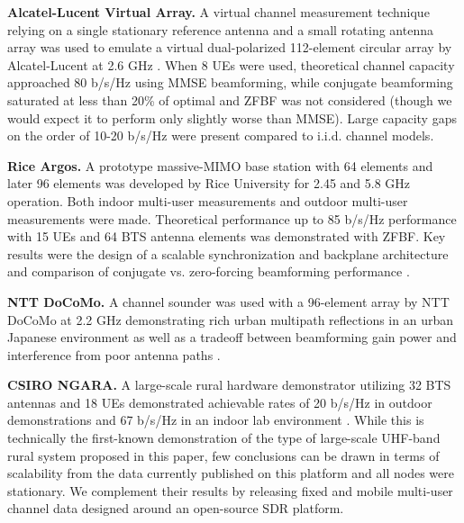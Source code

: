 \textbf{Alcatel-Lucent Virtual Array.}
A virtual channel measurement technique relying on a single stationary reference antenna and a small rotating antenna array was used to emulate a virtual dual-polarized 112-element circular array by Alcatel-Lucent at 2.6 GHz \cite{hoydis2012channel}.
	When 8 \acp{UE} were used, theoretical channel capacity approached 80 b/s/Hz using \ac{MMSE} beamforming, while conjugate beamforming saturated at less than 20\% of optimal and \ac{ZFBF} was not considered (though we would expect it to perform only slightly worse than \ac{MMSE}).
	Large capacity gaps on the order of 10-20 b/s/Hz were present compared to i.i.d. channel models.

\textbf{Rice Argos.}
A prototype massive-MIMO base station with 64 elements and later 96 elements was developed by Rice University for 2.45 and 5.8 GHz operation. Both indoor multi-user measurements \cite{shepard2012argos, shepard2013argosv2, shepard2013practical} and outdoor multi-user measurements \cite{everett2015measurement} were made. Theoretical performance up to 85 b/s/Hz performance with 15 \acp{UE} and 64 \ac{BTS} antenna elements was demonstrated with \ac{ZFBF}.
Key results were the design of a scalable synchronization and backplane architecture \cite{shepard2012argos} and comparison of conjugate vs. zero-forcing beamforming performance \cite{shepard2013practical}.

\textbf{NTT DoCoMo.}
A channel sounder was used with a 96-element array by NTT DoCoMo at 2.2 GHz demonstrating rich urban multipath reflections in an urban Japanese environment as well as a tradeoff between beamforming gain power and interference from poor antenna paths \cite{kataoka2014performance}.

\textbf{CSIRO NGARA.}
A large-scale rural hardware demonstrator utilizing 32 \ac{BTS} antennas and 18 \acp{UE} demonstrated achievable rates of 20 b/s/Hz in outdoor demonstrations and 67 b/s/Hz in an indoor lab environment \cite{suzuki2012highly, suzuki2012large}.
	While this is technically the first-known demonstration of the type of large-scale UHF-band rural system proposed in this paper, few conclusions can be drawn in terms of scalability from the data currently published on this platform and all nodes were stationary.
	We complement their results by releasing fixed and mobile multi-user channel data designed around an open-source \ac{SDR} platform.
	


